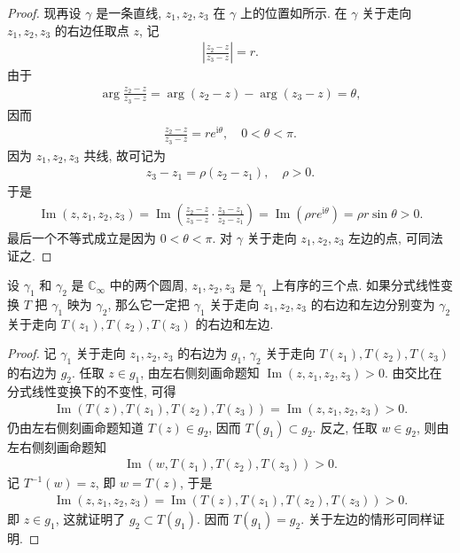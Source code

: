\documentclass[../../main.tex]{subfiles}%
\begin{document}
\begin{proof}
现再设 $\gamma$ 是一条直线, $z_1,z_2,z_3$ 在 $\gamma$ 上的位置如所示. 在 $\gamma$ 关于走向 $z_1,z_2,z_3$ 的右边任取点 $z$, 记
\begin{align*}
\left|\frac{z_2-z}{z_3-z}\right| = r.
\end{align*}
由于
\begin{align*}
\arg\frac{z_2-z}{z_3-z} = \arg(z_2-z) - \arg(z_3-z) = \theta,
\end{align*}
因而
\begin{align*}
\frac{z_2-z}{z_3-z} = re^{\mathrm{i}\theta }, \quad 0 < \theta < \pi.
\end{align*}
因为 $z_1,z_2,z_3$ 共线, 故可记为
\begin{align*}
z_3-z_1 = \rho(z_2-z_1), \quad \rho > 0.
\end{align*}
于是
\begin{align*}
\operatorname{Im}(z,z_1,z_2,z_3) = \operatorname{Im}\left(\frac{z_2-z}{z_3-z}\cdot\frac{z_3-z_1}{z_2-z_1}\right)
= \operatorname{Im}(\rho re^{\mathrm{i}\theta })
= \rho r\sin\theta > 0.
\end{align*}
最后一个不等式成立是因为 $0 < \theta < \pi$. 对 $\gamma$ 关于走向 $z_1,z_2,z_3$ 左边的点, 可同法证之.
\end{proof}

\begin{theorem}
设 $\gamma_1$ 和 $\gamma_2$ 是 $\mathbb{C}_\infty$ 中的两个圆周, $z_1,z_2,z_3$ 是 $\gamma_1$ 上有序的三个点. 如果分式线性变换 $T$ 把 $\gamma_1$ 映为 $\gamma_2$, 那么它一定把 $\gamma_1$ 关于走向 $z_1,z_2,z_3$ 的右边和左边分别变为 $\gamma_2$ 关于走向 $T(z_1),T(z_2),T(z_3)$ 的右边和左边.
\end{theorem}
\begin{proof}
记 $\gamma_1$ 关于走向 $z_1,z_2,z_3$ 的右边为 $g_1$, $\gamma_2$ 关于走向 $T(z_1),T(z_2),T(z_3)$ 的右边为 $g_2$. 任取 $z \in g_1$, 由左右侧刻画命题知 $\operatorname{Im}(z,z_1,z_2,z_3) > 0$. 由交比在分式线性变换下的不变性, 可得
\begin{align*}
\operatorname{Im}(T(z),T(z_1),T(z_2),T(z_3)) = \operatorname{Im}(z,z_1,z_2,z_3) > 0.
\end{align*}
仍由左右侧刻画命题知道 $T(z) \in g_2$, 因而 $T(g_1) \subset g_2$. 反之, 任取 $w \in g_2$, 则由左右侧刻画命题知
\begin{align*}
\operatorname{Im}(w,T(z_1),T(z_2),T(z_3)) > 0.
\end{align*}
记 $T^{-1}(w) = z$, 即 $w = T(z)$, 于是
\begin{align*}
\operatorname{Im}(z,z_1,z_2,z_3) = \operatorname{Im}(T(z),T(z_1),T(z_2),T(z_3)) > 0.
\end{align*}
即 $z \in g_1$, 这就证明了 $g_2 \subset T(g_1)$. 因而 $T(g_1) = g_2$. 关于左边的情形可同样证明.
\end{proof}
\end{document}
